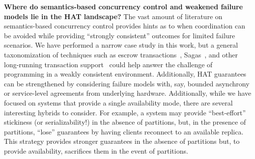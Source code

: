 \textbf{Where do semantics-based concurrency control and weakened
  failure models lie in the HAT landscape?} The vast amount of
literature on semantics-based concurrency control provides hints as to
when coordination can be avoided while providing ``strongly
consistent'' outcomes for limited failure scenarios. We have performed
a narrow case study in this work, but a general taxonomization of
techniques such as escrow transactions~\cite{escrow},
Sagas~\cite{sagas}, and other long-running transaction
support~\cite{gray-virtues} could help answer the challenge of
programming in a weakly consistent environment. Additionally, HAT
guarantees can be strengthened by considering failure models with,
say, bounded asynchrony or service-level agreements from underlying
hardware. Additionally, while we have focused on systems that provide
a single availability mode, there are several interesting hybrids to
consider. For example, a system may provide ``best-effort'' stickiness
(or serializability!) in the absence of partitions, but, in the
presence of partitions, ``lose'' guarantees by having clients
reconnect to an available replica. This strategy provides stronger
guarantees in the absence of partitions but, to provide availability,
sacrifices them in the event of partitions.
